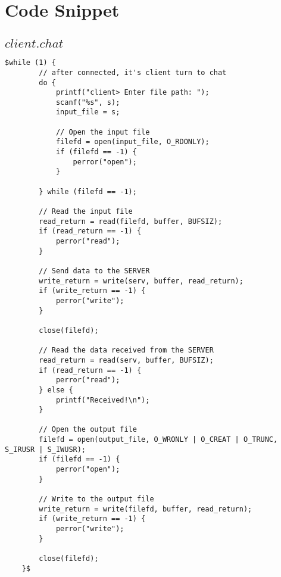 \documentclass[12pt,a4paper]{article}
\begin{document}
\section{Code Snippet}
\subsection*{$client.chat$}
\begin{lstlisting}
$while (1) {
        // after connected, it's client turn to chat
        do {
            printf("client> Enter file path: ");
            scanf("%s", s);
            input_file = s;

            // Open the input file
            filefd = open(input_file, O_RDONLY);
            if (filefd == -1) {
                perror("open");
            }

        } while (filefd == -1);

        // Read the input file
        read_return = read(filefd, buffer, BUFSIZ);
        if (read_return == -1) {
            perror("read");
        }
        
        // Send data to the SERVER
        write_return = write(serv, buffer, read_return);
        if (write_return == -1) {
            perror("write");
        }

        close(filefd);

        // Read the data received from the SERVER
        read_return = read(serv, buffer, BUFSIZ);
        if (read_return == -1) {
            perror("read");
        } else {
            printf("Received!\n");
        }

        // Open the output file
        filefd = open(output_file, O_WRONLY | O_CREAT | O_TRUNC, S_IRUSR | S_IWUSR);     
        if (filefd == -1) {
            perror("open");
        }

        // Write to the output file
        write_return = write(filefd, buffer, read_return);
        if (write_return == -1) {
            perror("write");
        }

        close(filefd);
    }$
\end{lstlisting}
\end{document}
